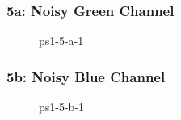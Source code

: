 \documentclass[../report.tex]{subfiles}
\begin{document}
    
    \begin{frame}
        \frametitle{5a: Noisy Green Channel}
        \begin{figure}[!htb]
            \centering
            \caption{ps1-5-a-1}
        \end{figure}
    \end{frame}

    \begin{frame}
        \frametitle{5b: Noisy Blue Channel}
        \begin{figure}[!htb]
            \centering
            \caption{ps1-5-b-1}
        \end{figure}
    \end{frame}
    
\end{document}
